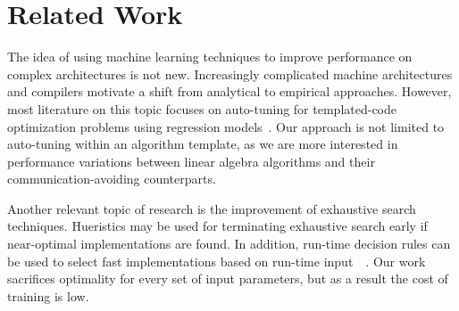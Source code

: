 \section{Related Work}
\label{s:related}
The idea of using machine learning techniques to improve performance on complex architectures is not new.
Increasingly complicated machine architectures and compilers motivate a shift from analytical to empirical approaches.
However, most literature on this topic focuses on auto-tuning for templated-code optimization problems using regression models~\cite{bergstra2012machine}.
Our approach is not limited to auto-tuning within an algorithm template, as we are more interested in performance variations between linear algebra algorithms and their communication-avoiding counterparts.

Another relevant topic of research is the improvement of exhaustive search techniques.
Hueristics may be used for terminating exhaustive search early if near-optimal implementations are found.
In addition, run-time decision rules can be used to select fast implementations based on run-time input~\cite{vuduc2001statistical}~\cite{vuduc2004statistical}.
Our work sacrifices optimality for every set of input parameters, but as a result the cost of training is low.


